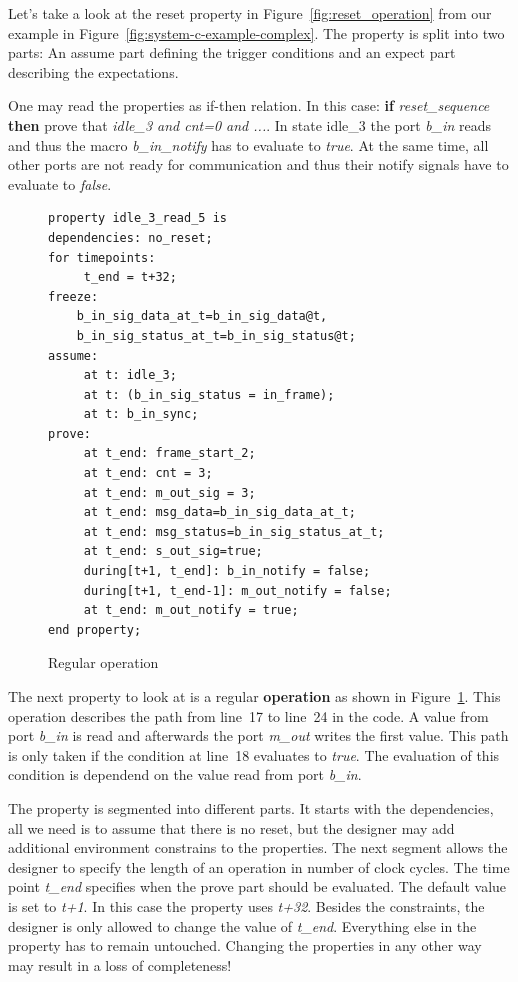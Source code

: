 Let's take a look at the reset property in Figure~\ref{fig:reset_operation} from our example in Figure~\ref{fig:system-c-example-complex}. 
The property is split into two parts: An assume part defining the trigger conditions and an expect part describing the expectations. 

One may read the properties as if-then relation. 
In this case: \textbf{if} \emph{reset\_sequence} \textbf{then} prove that \emph{idle\_3 and cnt=0 and ...}. 
In state idle\_3 the port \textit{b\_in} reads and thus the macro \textit{b\_in\_notify} has to evaluate to \textit{true}. 
At the same time, all other ports are not ready for communication and thus their notify signals have to evaluate to \textit{false}. 


\begin{small}
\begin{figure}
	\caption{Regular operation}
	\label{fig:regular_operation}
\begin{verbatim}
property idle_3_read_5 is
dependencies: no_reset;
for timepoints:
	 t_end = t+32;
freeze:
	b_in_sig_data_at_t=b_in_sig_data@t,
	b_in_sig_status_at_t=b_in_sig_status@t;
assume:
	 at t: idle_3;
	 at t: (b_in_sig_status = in_frame);
	 at t: b_in_sync;
prove:
	 at t_end: frame_start_2;
	 at t_end: cnt = 3;
	 at t_end: m_out_sig = 3;
	 at t_end: msg_data=b_in_sig_data_at_t;
	 at t_end: msg_status=b_in_sig_status_at_t;
	 at t_end: s_out_sig=true;
	 during[t+1, t_end]: b_in_notify = false;
	 during[t+1, t_end-1]: m_out_notify = false;
	 at t_end: m_out_notify = true;
end property;\end{verbatim}

\end{figure}
\end{small}

The next property to look at is a regular \textbf{operation} as shown in Figure~\ref{fig:regular_operation}. 
This operation describes the path from line~17 to line~24 in the code. 
A value from port \textit{b\_in} is read and afterwards the port \textit{m\_out} writes the first value. 
This path is only taken if the condition at line~18 evaluates to \textit{true}. 
The evaluation of this condition is dependend on the value read from port \textit{b\_in}. 

The property is segmented into different parts. 
It starts with the dependencies, all we need is to assume that there is no reset, but the designer may add additional environment constrains to the properties. 
The next segment allows the designer to specify the length of an operation in number of clock cycles. 
The time point \textit{t\_end} specifies when the prove part should be evaluated. 
The default value is set to \textit{t+1}. 
In this case the property uses \textit{t+32}. 
Besides the constraints, the designer is only allowed to change the value of \textit{t\_end}. 
Everything else in the property has to remain untouched. 
Changing the properties in any other way may result in a loss of completeness!


